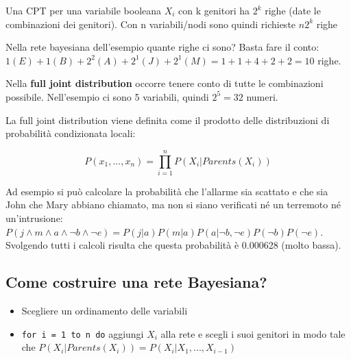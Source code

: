Una CPT per una variabile booleana $X_i$ con k genitori ha $2^k$ righe (date le combinazioni dei genitori). Con n variabili/nodi sono quindi richieste $n2^k$ righe

Nella rete bayesiana dell'esempio quante righe ci sono? Basta fare il conto: $1 (E) + 1 (B) + 2^2 (A) + 2^1 (J) + 2^1 (M) = 1 + 1 + 4 + 2 + 2 = 10$ righe.

Nella \textbf{full joint distribution} occorre tenere conto di tutte le combinazioni possibile. Nell'esempio ci sono 5 variabili, quindi $2^5 = 32$ numeri.

La full joint distribution viene definita come il prodotto delle distribuzioni di probabilità condizionata locali: 

\begin{equation}
 P(x_1, ..., x_n) = \prod_{i=1}^n P(X_i | Parents(X_i))
\end{equation}

Ad esempio si può calcolare la probabilità che l'allarme sia scattato e che sia John che Mary abbiano chiamato, ma non si siano verificati né un terremoto né un'intrusione:\\

$P(j \land m \land a \land \neg b \land \neg e) = P(j|a)P(m|a)P(a|\neg b, \neg e) P(\neg b) P(\neg e)$.\\

Svolgendo tutti i calcoli risulta che questa probabilità è 0.000628 (molto bassa).

\subsection{Come costruire una rete Bayesiana?}

\begin{itemize}
 \item Scegliere un ordinamento delle variabili
 \item \texttt{for i = 1 to n do} aggiungi $X_i$ alla rete e scegli i suoi genitori in modo tale che $P(X_i | Parents(X_i)) = P(X_i| X_1, ..., X_{i-1})$
\end{itemize}
